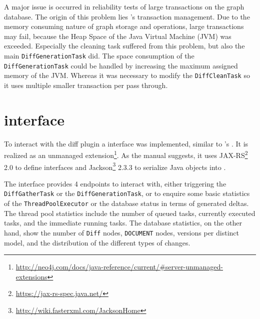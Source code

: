 	A major issue is occurred in reliability tests of large transactions on the graph database. The origin of this problem lies \neoj's transaction management. Due to the memory consuming nature of graph storage and operations, large transactions may fail, because the Heap Space of the Java Virtual Machine (JVM) was exceeded. Especially the cleaning task suffered from this problem, but also the main \texttt{DiffGenerationTask} did.
	The space consumption of the \texttt{DiffGenerationTask} could be handled by increasing the maximum assigned memory of the JVM. Whereas it was necessary to modify the \texttt{DiffCleanTask} so it uses multiple smaller transaction per pass through.
	
	\begin{comment}
	\begin{itemize}
		\item interaction with \bives and neo4j
		\item problems with Transaction rollback in actually successfull transactions
		\item trigger for generating diffs for new versions
	\end{itemize}
	\end{comment}

\section{\rest interface}
	\label{sec:impl:rest}
	
	To interact with the diff plugin a \rest interface was implemented, similar to \masymos's \morre. It is realized as an unmanaged \neoj extension\footnote{\url{http://neo4j.com/docs/java-reference/current/\#server-unmanaged-extensions}}. As the \neoj manual suggests, it uses JAX-RS\footnote{\url{https://jax-rs-spec.java.net/}} 2.0 to define interfaces and Jackson\footnote{\url{http://wiki.fasterxml.com/JacksonHome}} 2.3.3 to serialize Java objects into \json.
	
	The \rest interface provides 4 endpoints to interact with, either triggering the \texttt{DiffGatherTask} or the \texttt{DiffGenerationTask}, or to enquire some basic statistics of the \texttt{ThreadPoolExecutor} or the database status in terms of generated deltas.
	The thread pool statistics include the number of queued tasks, currently executed tasks, and the immediate running tasks.
	The database statistics, on the other hand, show the number of \texttt{Diff} nodes, \texttt{DOCUMENT} nodes, versions per distinct model, and the distribution of the different types of changes.
	
	\begin{comment}
	\begin{itemize}
		\item \rest interface for requesting diffs
	\end{itemize}
	\end{comment}